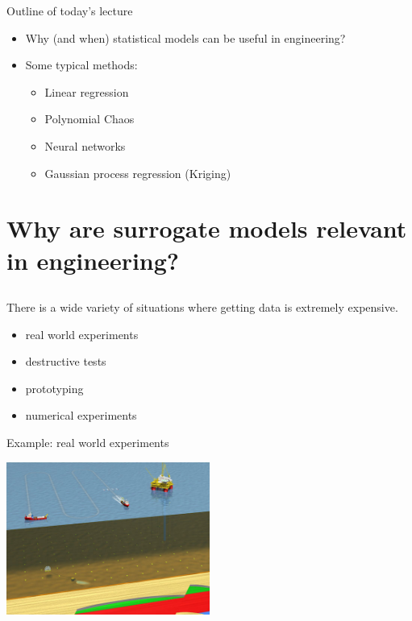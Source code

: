 \documentclass{beamer}
\begin{document}
\begin{frame}{}
Outline of today's lecture
\vspace{0.2cm}
\begin{itemize}
	\item Why (and when) statistical models can be useful in engineering?
	\item Some typical methods:
	\begin{itemize}
		\item Linear regression
		\item Polynomial Chaos
		\item Neural networks
		\item Gaussian process regression (Kriging)
	\end{itemize}
\end{itemize}
\end{frame}

\section[Surrogate models]{Why are surrogate models relevant in engineering?}
\subsection{}

\begin{frame}{}
There is a wide variety of situations where getting data is extremely expensive.
\begin{itemize}
	\item real world experiments
	\item destructive tests
	\item prototyping
	\item numerical experiments
\end{itemize}
\end{frame}

\begin{frame}{}
\begin{exampleblock}{Example: real world experiments}
\begin{center}
\includegraphics[height=5cm]{figures/drilling}
\end{center}
\end{exampleblock}
\end{frame}
\end{document}
